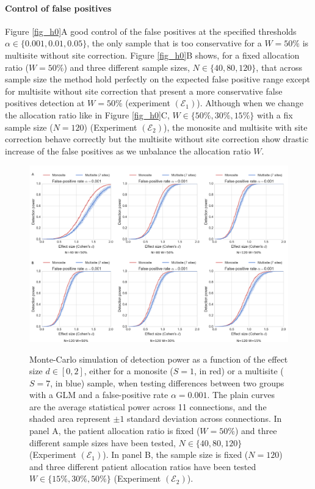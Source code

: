 \documentclass[authoryear]{elsarticle}
\begin{document}
\paragraph{Control of false positives} Figure \ref{fig_h0}A good control of the false positives at the specified thresholds $\alpha\in \{0.001, 0.01, 0.05\}$, the only sample that is too conservative for a $W=50\%$ is multisite without site correction. Figure \ref{fig_h0}B shows, for a fixed allocation ratio ($W=50\%$) and three different sample sizes, $N\in\{40, 80, 120\}$, that across sample size the method hold perfectly on the expected false positive range except for multisite without site correction that present a more conservative false positives detection at $W=50\%$ (experiment $(\mathcal{E}_1)$). Although when we change the allocation ratio like in Figure \ref{fig_h0}C, $W\in \{50\%, 30\%, 15\%\}$ with a fix sample size ($N=120$) (Experiment $(\mathcal{E}_2)$), the monosite and multisite with site correction behave correctly but the multisite without site correction show drastic increase of the false positives as we unbalance the allocation ratio $W$.

\begin{figure}[tbp]
\centering
{\includegraphics[width=\textwidth]{../figures/simulations_real_7sites.png}}

\caption{
Monte-Carlo simulation of detection power as a function of the effect size $d\in[0,2]$, either for a monosite ($S=1$, in red) or a multisite ($S=7$, in blue) sample, when testing differences between two groups with a GLM and a false-positive rate $\alpha=0.001$. The plain curves are the average statistical power across 11 connections, and the shaded area represent $\pm 1$ standard deviation across connections. In panel A, the patient allocation ratio is fixed ($W=50\%$) and three different sample sizes have been tested, $N\in\{40, 80, 120\}$ (Experiment $(\mathcal{E}_1)$). In panel B, the sample size is fixed ($N=120$) and three different patient allocation ratios have been tested $W\in \{15\%, 30\%,50\%\}$ (Experiment $(\mathcal{E}_2)$).
}
\label{fig_real_sim}
\end{figure}
\end{document}
